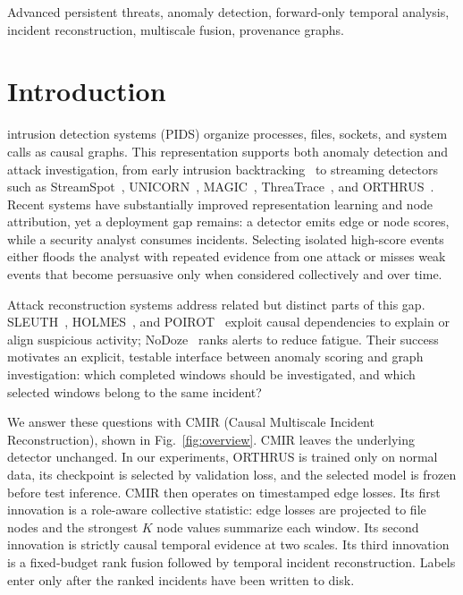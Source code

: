 \documentclass[lettersize,journal]{IEEEtran}
\newcommand{\method}{CMIR}
\begin{document}
\begin{IEEEkeywords}
Advanced persistent threats, anomaly detection, forward-only temporal analysis,
incident reconstruction, multiscale fusion, provenance graphs.
\end{IEEEkeywords}

\section{Introduction}
\label{sec:introduction}

 intrusion detection systems (PIDS) organize
processes, files, sockets, and system calls as causal graphs.  This representation
supports both anomaly detection and attack investigation, from early intrusion
backtracking~\cite{king2003backtracking} to streaming detectors such as
StreamSpot~\cite{manzoor2016streamspot}, UNICORN~\cite{han2020unicorn},
MAGIC~\cite{jia2024magic}, ThreaTrace~\cite{wang2022threatrace}, and
ORTHRUS~\cite{jiang2025orthrus}.  Recent systems
have substantially improved representation learning and node attribution, yet a
deployment gap remains: a detector emits edge or node scores, while a security
analyst consumes incidents.  Selecting isolated high-score events either floods
the analyst with repeated evidence from one attack or misses weak events that
become persuasive only when considered collectively and over time.

Attack reconstruction systems address related but distinct parts of this gap.
SLEUTH~\cite{hossain2017sleuth}, HOLMES~\cite{milajerdi2019holmes}, and
POIROT~\cite{milajerdi2019poirot} exploit causal dependencies to explain or align
suspicious activity; NoDoze~\cite{hassan2019nodoze} ranks alerts to reduce fatigue.
Their success motivates an explicit, testable interface between anomaly scoring
and graph investigation: which completed windows should be investigated, and
which selected windows belong to the same incident?

We answer these questions with \method{} (Causal Multiscale Incident
Reconstruction), shown in Fig.~\ref{fig:overview}.  \method{} leaves the
underlying detector unchanged.  In our experiments, ORTHRUS is trained only on
normal data, its checkpoint is selected by validation loss, and the selected
model is frozen before test inference.  \method{} then operates on timestamped
edge losses.  Its first innovation is a role-aware collective statistic: edge
losses are projected to file nodes and the strongest $K$ node values summarize
each window.  Its second innovation is strictly causal temporal evidence at two
scales.  Its third innovation is a fixed-budget rank fusion followed by temporal
incident reconstruction.  Labels enter only after the ranked incidents have
been written to disk.
\end{document}
